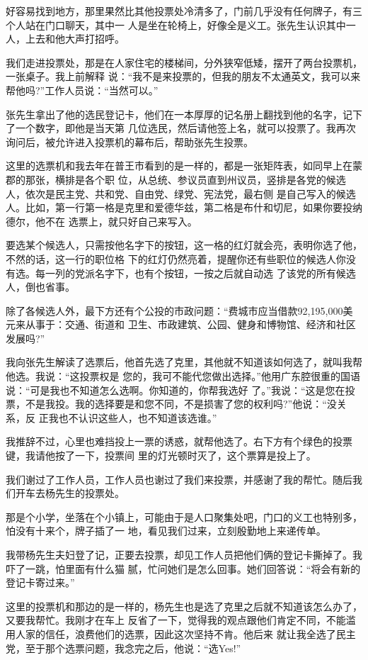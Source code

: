 ﻿\documentclass[11pt]{article}
\begin{document}
好容易找到地方，那里果然比其他投票处冷清多了，门前几乎没有任何牌子，有三个人站在门口聊天，其中一
人是坐在轮椅上，好像全是义工。张先生认识其中一人，上去和他大声打招呼。

我们走进投票处，那是在人家住宅的楼梯间，分外狭窄低矮，摆开了两台投票机，一张桌子。我上前解释
说：``我不是来投票的，但我的朋友不太通英文，我可以来帮他吗?''工作人员说：``当然可以。''

张先生拿出了他的选民登记卡，他们在一本厚厚的记名册上翻找到他的名字，记下了一个数字，即他是当天第
几位选民，然后请他签上名，就可以投票了。我再次询问后，被允许进入投票机的幕布后，帮助张先生投票。

这里的选票机和我去年在普王市看到的是一样的，都是一张矩阵表，如同早上在蒙郡的那张，横排是各个职
位，从总统、参议员直到州议员，竖排是各党的候选人，依次是民主党、共和党、自由党、绿党、宪法党，最右侧
是自己写入的候选人。比如，第一行第一格是克里和爱德华兹，第二格是布什和切尼，如果你要投纳德尔，他不在
选票上，就只好自己来写入。

要选某个候选人，只需按他名字下的按钮，这一格的红灯就会亮，表明你选了他，不然的话，这一行的职位格
下的红灯仍然亮着，提醒你还有些职位的候选人你没有选。每一列的党派名字下，也有个按钮，一按之后就自动选
了该党的所有候选人，倒也省事。

除了各候选人外，最下方还有个公投的市政问题：``费城市应当借款92,195,000美元来从事于：交通、街道和
卫生、市政建筑、公园、健身和博物馆、经济和社区发展吗?''

我向张先生解读了选票后，他首先选了克里，其他就不知道该如何选了，就叫我帮他选。我说：``这投票权是
您的，我可不能代您做出选择。''他用广东腔很重的国语说：``可是我也不知道怎么选啊。你知道的，你帮我选好
了。''我说：``这是您在投票，不是我投。我的选择要是和您不同，不是损害了您的权利吗?''他说：``没关系，反
正我也不认识这些人，也不知道该选谁。''


我推辞不过，心里也难挡投上一票的诱惑，就帮他选了。右下方有个绿色的投票键，我请他按了一下，投票间
里的灯光顿时灭了，这个票算是投上了。

我们谢过了工作人员，工作人员也谢过了我们来投票，并感谢了我的帮忙。随后我们开车去杨先生的投票处。

那是个小学，坐落在个小镇上，可能由于是人口聚集处吧，门口的义工也特别多，怕没有十来个，牌子插了一
地，看见我们过来，立刻殷勤地上来递传单。

我带杨先生夫妇登了记，正要去投票，却见工作人员把他们俩的登记卡撕掉了。我吓了一跳，怕里面有什么猫
腻，忙问她们是怎么回事。她们回答说：``将会有新的登记卡寄过来。''

这里的投票机和那边的是一样的，杨先生也是选了克里之后就不知道该怎么办了，又要我帮忙。我刚才在车上
反省了一下，觉得我的观点跟他们肯定不同，不能滥用人家的信任，浪费他们的选票，因此这次坚持不肯。他后来
就让我全选了民主党，至于那个选票问题，我念完之后，他说：``选Yes!''
\end{document}
